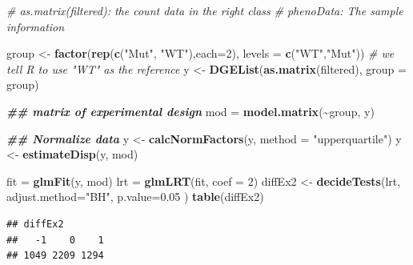 \documentclass[
]{book}
\newenvironment{Shaded}{\begin{snugshade}}{\end{snugshade}}
\newcommand{\AttributeTok}[1]{\textcolor[rgb]{0.13,0.29,0.53}{#1}}
\newcommand{\CommentTok}[1]{\textcolor[rgb]{0.56,0.35,0.01}{\textit{#1}}}
\newcommand{\DecValTok}[1]{\textcolor[rgb]{0.00,0.00,0.81}{#1}}
\newcommand{\DocumentationTok}[1]{\textcolor[rgb]{0.56,0.35,0.01}{\textbf{\textit{#1}}}}
\newcommand{\FloatTok}[1]{\textcolor[rgb]{0.00,0.00,0.81}{#1}}
\newcommand{\FunctionTok}[1]{\textcolor[rgb]{0.13,0.29,0.53}{\textbf{#1}}}
\newcommand{\NormalTok}[1]{#1}
\newcommand{\OtherTok}[1]{\textcolor[rgb]{0.56,0.35,0.01}{#1}}
\newcommand{\SpecialCharTok}[1]{\textcolor[rgb]{0.81,0.36,0.00}{\textbf{#1}}}
\newcommand{\StringTok}[1]{\textcolor[rgb]{0.31,0.60,0.02}{#1}}
\begin{document}
\begin{Shaded}
\begin{Highlighting}[]
\CommentTok{\#  as.matrix(filtered): the count data in the right class}
\CommentTok{\# phenoData: The sample information}

\NormalTok{group }\OtherTok{\textless{}{-}} \FunctionTok{factor}\NormalTok{(}\FunctionTok{rep}\NormalTok{(}\FunctionTok{c}\NormalTok{(}\StringTok{"Mut"}\NormalTok{, }\StringTok{"WT"}\NormalTok{),}\AttributeTok{each=}\DecValTok{2}\NormalTok{), }
    \AttributeTok{levels =} \FunctionTok{c}\NormalTok{(}\StringTok{"WT"}\NormalTok{,}\StringTok{"Mut"}\NormalTok{)) }\CommentTok{\# we tell R to use "WT" as the reference}
\NormalTok{y }\OtherTok{\textless{}{-}} \FunctionTok{DGEList}\NormalTok{(}\FunctionTok{as.matrix}\NormalTok{(filtered),}
           \AttributeTok{group =}\NormalTok{ group)  }

\DocumentationTok{\#\# matrix of experimental design }
\NormalTok{mod }\OtherTok{=} \FunctionTok{model.matrix}\NormalTok{(}\SpecialCharTok{\textasciitilde{}}\NormalTok{group, y)}


\DocumentationTok{\#\# Normalize data}
\NormalTok{y }\OtherTok{\textless{}{-}} \FunctionTok{calcNormFactors}\NormalTok{(y, }\AttributeTok{method =} \StringTok{"upperquartile"}\NormalTok{)}
\NormalTok{y }\OtherTok{\textless{}{-}} \FunctionTok{estimateDisp}\NormalTok{(y, mod)}

\NormalTok{fit }\OtherTok{=} \FunctionTok{glmFit}\NormalTok{(y, mod)}
\NormalTok{lrt }\OtherTok{=} \FunctionTok{glmLRT}\NormalTok{(fit, }\AttributeTok{coef =} \DecValTok{2}\NormalTok{)}
\NormalTok{diffEx2 }\OtherTok{\textless{}{-}} \FunctionTok{decideTests}\NormalTok{(lrt, }
    \AttributeTok{adjust.method=}\StringTok{"BH"}\NormalTok{, }
    \AttributeTok{p.value=}\FloatTok{0.05}
\NormalTok{)}
\FunctionTok{table}\NormalTok{(diffEx2)}
\end{Highlighting}
\end{Shaded}

\begin{verbatim}
## diffEx2
##   -1    0    1 
## 1049 2209 1294
\end{verbatim}

\begin{Shaded}
\end{Shaded}
\end{document}
